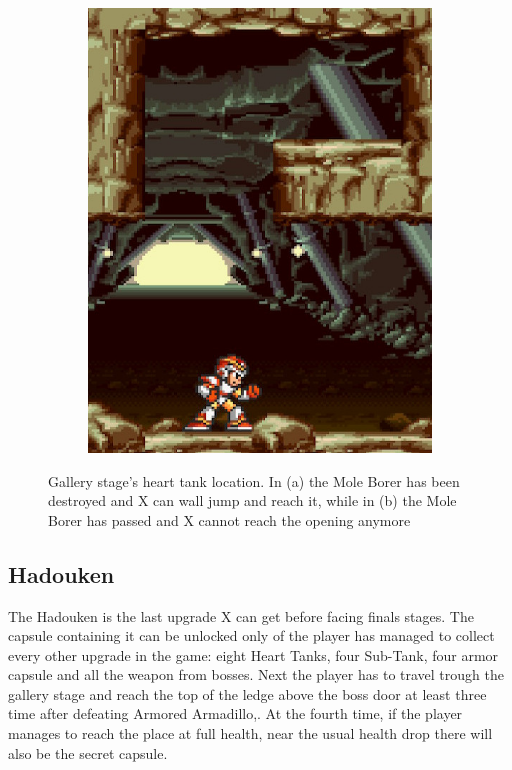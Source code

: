 \begin{figure}[htp]
\begin{subfigure}{0.3\textwidth}
		\includegraphics[width=\linewidth]{figures/X1/Armored_armadillo/Armadillo_heart_2.jpg}
		\caption{}
	\end{subfigure}
	\caption{Gallery stage's heart tank location. In (a) the Mole Borer has been destroyed and X can wall jump and reach it, while in (b) the Mole Borer has passed and X cannot reach the opening anymore}
\end{figure}

\subsection{Hadouken}\label{Hadouken}
The Hadouken is the last upgrade X can get before facing finals stages. The capsule containing it can be unlocked only of the player has managed to collect every other upgrade in the game: eight Heart Tanks, four Sub-Tank, four armor capsule and all the weapon from bosses. Next the player has to travel trough the gallery stage and reach the top of the ledge above the boss door at least three time after defeating Armored Armadillo,. At the fourth time, if the player manages to reach the place at full health, near the usual health drop there will also be the secret capsule.

